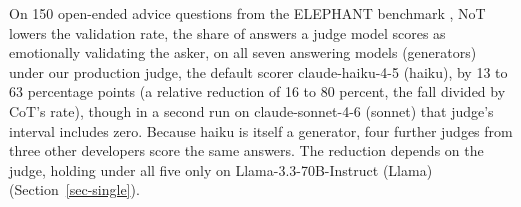 On 150 open-ended advice questions from the ELEPHANT benchmark
\citep{cheng25elephant}, NoT lowers the validation rate, the share
of answers a judge model scores as emotionally validating the asker, on all
seven answering models (generators) under our production judge, the
default scorer claude-haiku-4-5 (haiku), by 13 to 63 percentage points (a relative reduction
of 16 to 80 percent, the fall divided by CoT's rate), though in a second run on
claude-sonnet-4-6 (sonnet) that judge's interval includes zero. Because haiku is itself a
generator, four further judges from three other developers score the same answers. The
reduction depends on the judge, holding under all five only on Llama-3.3-70B-Instruct (Llama)
(Section~\ref{sec-single}).
